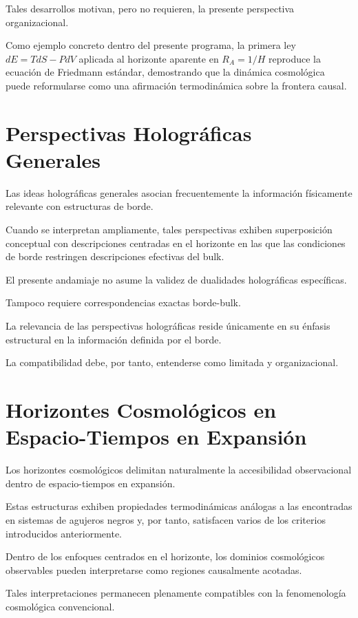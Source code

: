 \documentclass[12pt,a4paper]{article}
\begin{document}
Tales desarrollos motivan, pero no requieren, la presente perspectiva organizacional.

Como ejemplo concreto dentro del presente programa, la primera ley $dE = TdS - PdV$ aplicada al horizonte aparente en $R_A = 1/H$ reproduce la ecuación de Friedmann estándar, demostrando que la dinámica cosmológica puede reformularse como una afirmación termodinámica sobre la frontera causal.

\section{Perspectivas Holográficas Generales}

Las ideas holográficas generales asocian frecuentemente la información físicamente relevante con estructuras de borde.

Cuando se interpretan ampliamente, tales perspectivas exhiben superposición conceptual con descripciones centradas en el horizonte en las que las condiciones de borde restringen descripciones efectivas del bulk.

El presente andamiaje no asume la validez de dualidades holográficas específicas.

Tampoco requiere correspondencias exactas borde-bulk.

La relevancia de las perspectivas holográficas reside únicamente en su énfasis estructural en la información definida por el borde.

La compatibilidad debe, por tanto, entenderse como limitada y organizacional.

\section{Horizontes Cosmológicos en Espacio-Tiempos en Expansión}

Los horizontes cosmológicos delimitan naturalmente la accesibilidad observacional dentro de espacio-tiempos en expansión.

Estas estructuras exhiben propiedades termodinámicas análogas a las encontradas en sistemas de agujeros negros y, por tanto, satisfacen varios de los criterios introducidos anteriormente.

Dentro de los enfoques centrados en el horizonte, los dominios cosmológicos observables pueden interpretarse como regiones causalmente acotadas.

Tales interpretaciones permanecen plenamente compatibles con la fenomenología cosmológica convencional.
\end{document}
